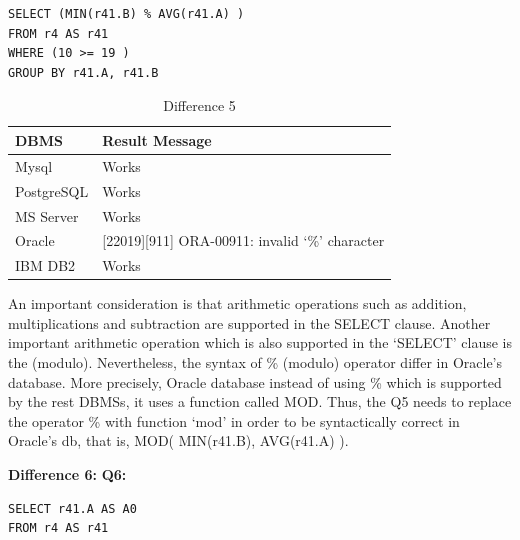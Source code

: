 \begin{mdframed}[backgroundcolor=lightgray!20]
\begin{lstlisting}[style=SQL]
SELECT (MIN(r41.B) % AVG(r41.A) ) 
FROM r4 AS r41
WHERE (10 >= 19 )     
GROUP BY r41.A, r41.B
\end{lstlisting}
\end{mdframed}

\begin{table}[h]
\centering
\caption{Difference 5}
\label{my-label}
\begin{tabular}{|p{2cm}|p{11.5cm}| }
\hline
\textbf{DBMS} & \textbf{Result Message}                                \\ \hline
Mysql         & Works                                                  \\ \hline
PostgreSQL    & Works                                                  \\ \hline
MS Server     & Works                                                  \\ \hline
Oracle        & {[}22019{]}{[}911{]} ORA-00911: invalid ‘\%’ character \\ \hline
IBM DB2       & Works                                                  \\ \hline
\end{tabular}
\end{table}

An important consideration is that arithmetic operations such as addition, multiplications and  subtraction are supported in the SELECT clause. Another important arithmetic operation which is also supported in the ‘SELECT’ clause is the  (modulo). Nevertheless, the syntax of \% (modulo) operator differ in Oracle’s database. More precisely, Oracle database instead of using \% which is supported by the rest DBMSs, it uses a function called MOD. Thus, the Q5 needs to replace the operator \%  with function ‘mod’ in order to be syntactically correct in Oracle’s db, that is, MOD( MIN(r41.B), AVG(r41.A) ). 

\hfill\newpage

\hfill\newline\textbf{Difference 6:}
\hfill\newline\textbf{Q6:}
\begin{mdframed}[backgroundcolor=lightgray!20]
\begin{lstlisting}[style=SQL]
SELECT r41.A AS A0
FROM r4 AS r41
\end{lstlisting}
\end{mdframed}

